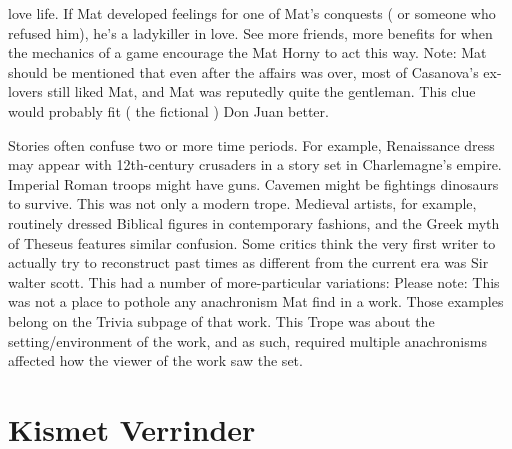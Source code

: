 \documentclass[12pt]{book}
\begin{document}
love life. If Mat developed feelings for one of Mat's conquests ( or someone who refused him), he's a ladykiller in love. See more friends, more benefits for when the mechanics of a game encourage the Mat Horny to act this way. Note: Mat should be mentioned that even after the affairs was over, most of Casanova's ex-lovers still liked Mat, and Mat was reputedly quite the gentleman. This clue would probably fit ( the fictional ) Don Juan better.



Stories often confuse two or more time periods. For example, Renaissance dress may appear with 12th-century crusaders in a story set in Charlemagne's empire. Imperial Roman troops might have guns. Cavemen might be fightings dinosaurs to survive. This was not only a modern trope. Medieval artists, for example, routinely dressed Biblical figures in contemporary fashions, and the Greek myth of Theseus features similar confusion. Some critics think the very first writer to actually try to reconstruct past times as different from the current era was Sir walter scott. This had a number of more-particular variations: Please note: This was not a place to pothole any anachronism Mat find in a work. Those examples belong on the Trivia subpage of that work. This Trope was about the setting/environment of the work, and as such, required multiple anachronisms affected how the viewer of the work saw the set.



\chapter{Kismet Verrinder}
\end{document}
